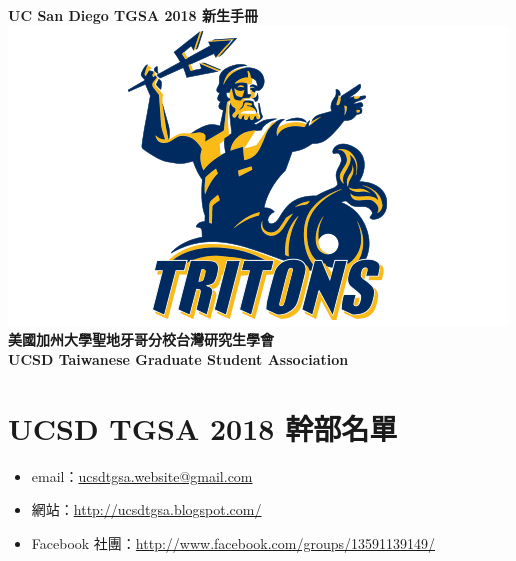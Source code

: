 \documentclass[10pt,a4paper]{book}
\begin{document}
\begin{CJK}{UTF8}{bkai}

\begin{titlepage}
\clearpage
\vspace*{\fill}
\begin{minipage}{\textwidth}

\begin{center}
\textbf{\huge UC San Diego TGSA 2018 新生手冊}
\vspace{1.5cm}\\ \includegraphics[width=\textwidth]{Pics/triton}\\ \vspace{1.5cm}
\textbf{\LARGE 美國加州大學聖地牙哥分校台灣研究生學會}\\ \vspace{0.2cm}
\textbf{\large UCSD Taiwanese Graduate Student Association}
\end{center}

\end{minipage}
\vfill
\clearpage
\end{titlepage}

\frontmatter
\chapter*{UCSD TGSA 2018 幹部名單}

\begin{itemize}
\item email：\url{ucsdtgsa.website@gmail.com}
\item 網站：\url{http://ucsdtgsa.blogspot.com/}
\item Facebook 社團：\url{http://www.facebook.com/groups/13591139149/}
\end{itemize}


\end{CJK}
\end{document}
